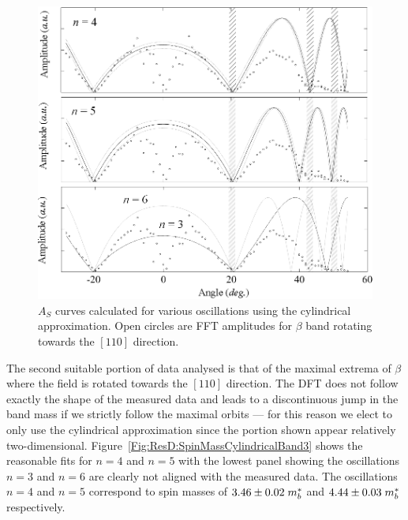 \begin{figure}[htbp]
    \begin{center}
        \includegraphics[scale=0.75]{Chapter-dHvABaFe2P2/Figures/Mass/SpinMassBand3Cylindrical/SpinMassBand3Cylindrical_110}
        \caption{$A_S$ curves calculated for various oscillations using the cylindrical approximation. Open circles are \ac{FFT} amplitudes for $\beta$ band rotating towards the $[110]$ direction.}
        \label{Fig:ResD:SpinMassFromDFTBand3}
    \end{center}
\end{figure}
The second suitable portion of data analysed is that of the maximal extrema of $\beta$ where the field is rotated towards the $[110]$ direction. The \ac{DFT} does not follow exactly the shape of the measured data and leads to a discontinuous jump in the band mass if we strictly follow the maximal orbits --- for this reason we elect to only use the cylindrical approximation since the portion shown appear relatively two-dimensional. Figure~\ref{Fig:ResD:SpinMassCylindricalBand3} shows the reasonable fits for $n=4$ and $n=5$ with the lowest panel showing the oscillations $n=3$ and $n=6$ are clearly not aligned with the measured data. The oscillations $n=4$ and $n=5$ correspond to spin masses of $3.46\pm0.02\; m^*_b$ and $4.44\pm0.03\; m^*_b$ respectively.

